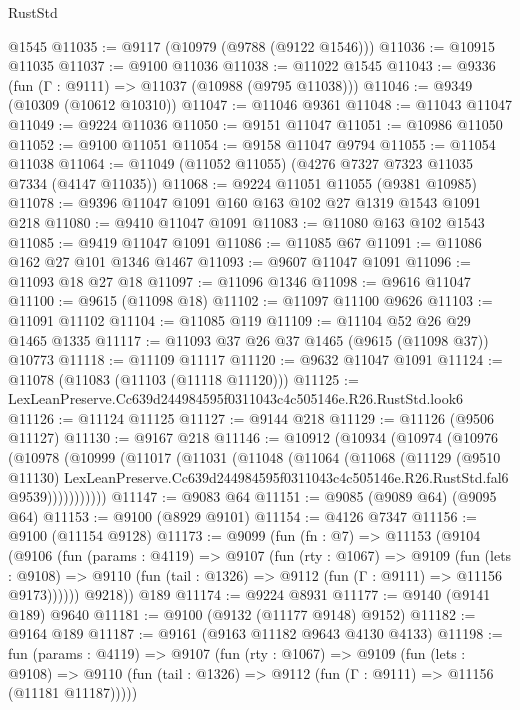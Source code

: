 \begin{lexlean}{RustStd}
\begin{coremodule}
    @1545
@11035 := @9117 (@10979 (@9788 (@9122 @1546)))
@11036 := @10915 @11035
@11037 := @9100 @11036
@11038 := @11022 @1545
@11043 := @9336 (fun (Γ : @9111) => @11037 (@10988 (@9795 @11038)))
@11046 := @9349 (@10309 (@10612 @10310))
@11047 := @11046 @9361
@11048 := @11043 @11047
@11049 := @9224 @11036
@11050 := @9151 @11047
@11051 := @10986 @11050
@11052 := @9100 @11051
@11054 := @9158 @11047 @9794
@11055 := @11054 @11038
@11064 := @11049 (@11052 @11055) (@4276 @7327 @7323 @11035 @7334 (@4147 @11035))
@11068 := @9224 @11051 @11055 (@9381 @10985)
@11078 := @9396 @11047 @1091 @160 @163 @102 @27 @1319 @1543 @1091 @218
@11080 := @9410 @11047 @1091
@11083 := @11080 @163 @102 @1543
@11085 := @9419 @11047 @1091
@11086 := @11085 @67
@11091 := @11086 @162 @27 @101 @1346 @1467
@11093 := @9607 @11047 @1091
@11096 := @11093 @18 @27 @18
@11097 := @11096 @1346
@11098 := @9616 @11047
@11100 := @9615 (@11098 @18)
@11102 := @11097 @11100 @9626
@11103 := @11091 @11102
@11104 := @11085 @119
@11109 := @11104 @52 @26 @29 @1465 @1335
@11117 := @11093 @37 @26 @37 @1465 (@9615 (@11098 @37)) @10773
@11118 := @11109 @11117
@11120 := @9632 @11047 @1091
@11124 := @11078 (@11083 (@11103 (@11118 @11120)))
@11125 := LexLeanPreserve.Cc639d244984595f0311043c4c505146e.R26.RustStd.look6
@11126 := @11124 @11125
@11127 := @9144 @218
@11129 := @11126 (@9506 @11127)
@11130 := @9167 @218
@11146 := @10912
    (@10934
      (@10974
        (@10976
          (@10978
            (@10999
              (@11017
                (@11031
                  (@11048
                    (@11064
                      (@11068
                        (@11129
                          (@9510 @11130)
                          LexLeanPreserve.Cc639d244984595f0311043c4c505146e.R26.RustStd.fal6
                          @9539)))))))))))
@11147 := @9083 @64
@11151 := @9085 (@9089 @64) (@9095 @64)
@11153 := @9100 (@8929 @9101)
@11154 := @4126 @7347
@11156 := @9100 (@11154 @9128)
@11173 := @9099
    (fun (fn : @7) =>
    @11153
      (@9104
        (@9106
          (fun (params : @4119) =>
          @9107
            (fun (rty : @1067) =>
            @9109
              (fun (lets : @9108) =>
              @9110 (fun (tail : @1326) => @9112 (fun (Γ : @9111) => @11156 @9173))))))
        @9218))
    @189
@11174 := @9224 @8931
@11177 := @9140 (@9141 @189) @9640
@11181 := @9100 (@9132 (@11177 @9148) @9152)
@11182 := @9164 @189
@11187 := @9161 (@9163 @11182 @9643 @4130 @4133)
@11198 := fun (params : @4119) =>
  @9107
    (fun (rty : @1067) =>
    @9109
      (fun (lets : @9108) =>
      @9110 (fun (tail : @1326) => @9112 (fun (Γ : @9111) => @11156 (@11181 @11187)))))

\end{coremodule}
\end{lexlean}
